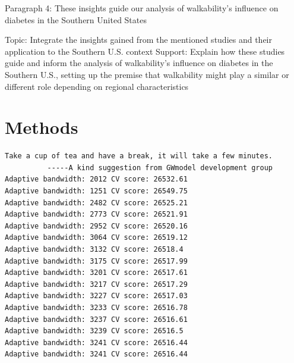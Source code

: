 \documentclass[
]{article}
\begin{document}
Paragraph 4: These insights guide our analysis of walkability's
influence on diabetes in the Southern United States

Topic: Integrate the insights gained from the mentioned studies and
their application to the Southern U.S. context Support: Explain how
these studies guide and inform the analysis of walkability's influence
on diabetes in the Southern U.S., setting up the premise that
walkability might play a similar or different role depending on regional
characteristics

\section{Methods}\label{methods}

\begin{verbatim}
Take a cup of tea and have a break, it will take a few minutes.
          -----A kind suggestion from GWmodel development group
Adaptive bandwidth: 2012 CV score: 26532.61 
Adaptive bandwidth: 1251 CV score: 26549.75 
Adaptive bandwidth: 2482 CV score: 26525.21 
Adaptive bandwidth: 2773 CV score: 26521.91 
Adaptive bandwidth: 2952 CV score: 26520.16 
Adaptive bandwidth: 3064 CV score: 26519.12 
Adaptive bandwidth: 3132 CV score: 26518.4 
Adaptive bandwidth: 3175 CV score: 26517.99 
Adaptive bandwidth: 3201 CV score: 26517.61 
Adaptive bandwidth: 3217 CV score: 26517.29 
Adaptive bandwidth: 3227 CV score: 26517.03 
Adaptive bandwidth: 3233 CV score: 26516.78 
Adaptive bandwidth: 3237 CV score: 26516.61 
Adaptive bandwidth: 3239 CV score: 26516.5 
Adaptive bandwidth: 3241 CV score: 26516.44 
Adaptive bandwidth: 3241 CV score: 26516.44 
\end{verbatim}
\end{document}
